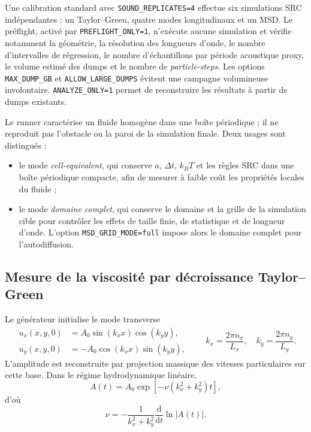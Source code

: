 \documentclass[11pt,a4paper]{article}
\begin{document}
Une calibration standard avec \texttt{SOUND\_REPLICATES=4} effectue six simulations SRC indépendantes : un Taylor--Green, quatre modes longitudinaux et un MSD. Le préflight, activé par \texttt{PREFLIGHT\_ONLY=1}, n'exécute aucune simulation et vérifie notamment la géométrie, la résolution des longueurs d'onde, le nombre d'intervalles de régression, le nombre d'échantillons par période acoustique proxy, le volume estimé des dumps et le nombre de \emph{particle-steps}. Les options \texttt{MAX\_DUMP\_GB} et \texttt{ALLOW\_LARGE\_DUMPS} évitent une campagne volumineuse involontaire. \texttt{ANALYZE\_ONLY=1} permet de reconstruire les résultats à partir de dumps existants.

Le runner caractérise un fluide homogène dans une boîte périodique ; il ne reproduit pas l'obstacle ou la paroi de la simulation finale. Deux usages sont distingués :
\begin{itemize}[leftmargin=*]
  \item le mode \emph{cell-equivalent}, qui conserve $a$, $\Delta t$, $k_BT$ et les règles SRC dans une boîte périodique compacte, afin de mesurer à faible coût les propriétés locales du fluide ;
  \item le mode \emph{domaine complet}, qui conserve le domaine et la grille de la simulation cible pour contrôler les effets de taille finie, de statistique et de longueur d'onde. L'option \texttt{MSD\_GRID\_MODE=full} impose alors le domaine complet pour l'autodiffusion.
\end{itemize}

\subsection{Mesure de la viscosité par décroissance Taylor--Green}

Le générateur initialise le mode transverse
\begin{equation}
\begin{aligned}
  u_x(x,y,0)&=A_0\sin(k_xx)\cos(k_yy),\\
  u_y(x,y,0)&=-A_0\cos(k_xx)\sin(k_yy),
\end{aligned}
\qquad
k_x=\frac{2\pi n_x}{L_x},\quad
k_y=\frac{2\pi n_y}{L_y}.
\end{equation}
L'amplitude est reconstruite par projection massique des vitesses particulaires sur cette base. Dans le régime hydrodynamique linéaire,
\begin{equation}
  A(t)=A_0\exp\left[-\nu(k_x^2+k_y^2)t\right],
\end{equation}
d'où
\begin{equation}
  \nu=-\frac{1}{k_x^2+k_y^2}\frac{\mathrm d}{\mathrm dt}\ln|A(t)|.
\end{equation}
\end{document}
